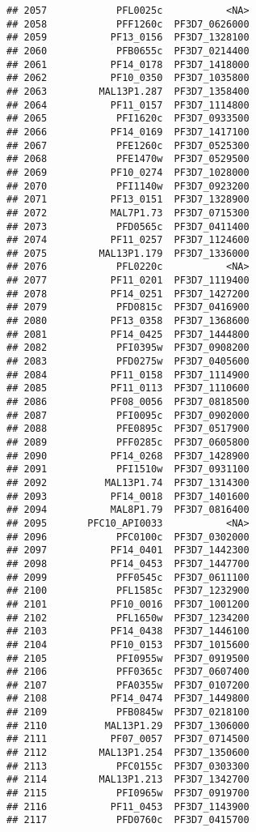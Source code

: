 \documentclass{article}\usepackage[]{graphicx}\usepackage[]{color}
\makeatletter
\newenvironment{kframe}{%
 \def\at@end@of@kframe{}%
 \ifinner\ifhmode%
  \def\at@end@of@kframe{\end{minipage}}%
  \begin{minipage}{\columnwidth}%
 \fi\fi%
 \def\FrameCommand##1{\hskip\@totalleftmargin \hskip-\fboxsep
 \colorbox{shadecolor}{##1}\hskip-\fboxsep
     \hskip-\linewidth \hskip-\@totalleftmargin \hskip\columnwidth}%
 \MakeFramed {\advance\hsize-\width
   \@totalleftmargin\z@ \linewidth\hsize
   \@setminipage}}%
 {\par\unskip\endMakeFramed%
 \at@end@of@kframe}
\newenvironment{knitrout}{}{} %
\makeatother
\begin{document}
\begin{knitrout}
\begin{kframe}
\begin{verbatim}
## 2057            PFL0025c           <NA>
## 2058            PFF1260c  PF3D7_0626000
## 2059           PF13_0156  PF3D7_1328100
## 2060            PFB0655c  PF3D7_0214400
## 2061           PF14_0178  PF3D7_1418000
## 2062           PF10_0350  PF3D7_1035800
## 2063         MAL13P1.287  PF3D7_1358400
## 2064           PF11_0157  PF3D7_1114800
## 2065            PFI1620c  PF3D7_0933500
## 2066           PF14_0169  PF3D7_1417100
## 2067            PFE1260c  PF3D7_0525300
## 2068            PFE1470w  PF3D7_0529500
## 2069           PF10_0274  PF3D7_1028000
## 2070            PFI1140w  PF3D7_0923200
## 2071           PF13_0151  PF3D7_1328900
## 2072           MAL7P1.73  PF3D7_0715300
## 2073            PFD0565c  PF3D7_0411400
## 2074           PF11_0257  PF3D7_1124600
## 2075         MAL13P1.179  PF3D7_1336000
## 2076            PFL0220c           <NA>
## 2077           PF11_0201  PF3D7_1119400
## 2078           PF14_0251  PF3D7_1427200
## 2079            PFD0815c  PF3D7_0416900
## 2080           PF13_0358  PF3D7_1368600
## 2081           PF14_0425  PF3D7_1444800
## 2082            PFI0395w  PF3D7_0908200
## 2083            PFD0275w  PF3D7_0405600
## 2084           PF11_0158  PF3D7_1114900
## 2085           PF11_0113  PF3D7_1110600
## 2086           PF08_0056  PF3D7_0818500
## 2087            PFI0095c  PF3D7_0902000
## 2088            PFE0895c  PF3D7_0517900
## 2089            PFF0285c  PF3D7_0605800
## 2090           PF14_0268  PF3D7_1428900
## 2091            PFI1510w  PF3D7_0931100
## 2092          MAL13P1.74  PF3D7_1314300
## 2093           PF14_0018  PF3D7_1401600
## 2094           MAL8P1.79  PF3D7_0816400
## 2095       PFC10_API0033           <NA>
## 2096            PFC0100c  PF3D7_0302000
## 2097           PF14_0401  PF3D7_1442300
## 2098           PF14_0453  PF3D7_1447700
## 2099            PFF0545c  PF3D7_0611100
## 2100            PFL1585c  PF3D7_1232900
## 2101           PF10_0016  PF3D7_1001200
## 2102            PFL1650w  PF3D7_1234200
## 2103           PF14_0438  PF3D7_1446100
## 2104           PF10_0153  PF3D7_1015600
## 2105            PFI0955w  PF3D7_0919500
## 2106            PFF0365c  PF3D7_0607400
## 2107            PFA0355w  PF3D7_0107200
## 2108           PF14_0474  PF3D7_1449800
## 2109            PFB0845w  PF3D7_0218100
## 2110          MAL13P1.29  PF3D7_1306000
## 2111           PF07_0057  PF3D7_0714500
## 2112         MAL13P1.254  PF3D7_1350600
## 2113            PFC0155c  PF3D7_0303300
## 2114         MAL13P1.213  PF3D7_1342700
## 2115            PFI0965w  PF3D7_0919700
## 2116           PF11_0453  PF3D7_1143900
## 2117            PFD0760c  PF3D7_0415700

\end{verbatim}
\end{kframe}
\end{knitrout}
\end{document}
